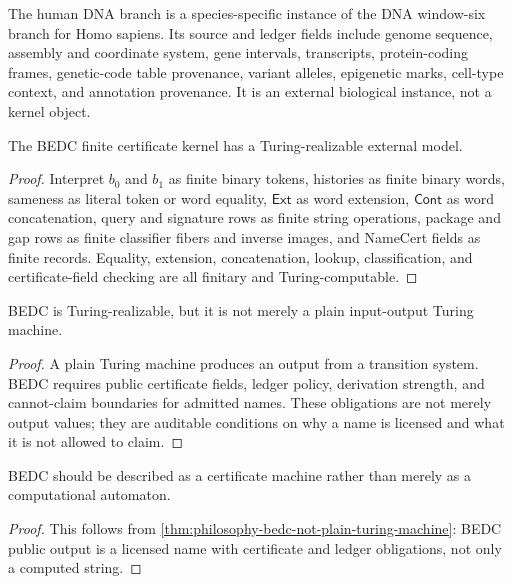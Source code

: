 \begin{definition}
\label{def:philosophy-human-dna-branch}
The human DNA branch is a species-specific instance of the DNA
window-six branch for Homo sapiens. Its source and ledger fields include
genome sequence, assembly and coordinate system, gene intervals,
transcripts, protein-coding frames, genetic-code table provenance,
variant alleles, epigenetic marks, cell-type context, and annotation
provenance. It is an external biological instance, not a kernel object.
\end{definition}

\begin{theorem}
\label{thm:philosophy-bedc-finite-kernel-turing-realizable}
The BEDC finite certificate kernel has a Turing-realizable external
model.
\end{theorem}
\begin{proof}
Interpret $b_{0}$ and $b_{1}$ as finite binary tokens, histories as
finite binary words, sameness as literal token or word equality,
$\mathsf{Ext}$ as word extension, $\mathsf{Cont}$ as word concatenation,
query and signature rows as finite string operations, package and gap
rows as finite classifier fibers and inverse images, and NameCert fields
as finite records. Equality, extension, concatenation, lookup,
classification, and certificate-field checking are all finitary and
Turing-computable.
\end{proof}

\begin{theorem}
\label{thm:philosophy-bedc-not-plain-turing-machine}
BEDC is Turing-realizable, but it is not merely a plain input-output
Turing machine.
\end{theorem}
\begin{proof}
A plain Turing machine produces an output from a transition system. BEDC
requires public certificate fields, ledger policy, derivation strength,
and cannot-claim boundaries for admitted names. These obligations are
not merely output values; they are auditable conditions on why a name is
licensed and what it is not allowed to claim.
\end{proof}

\begin{corollary}
\label{cor:philosophy-bedc-as-certificate-machine}
BEDC should be described as a certificate machine rather than merely as
a computational automaton.
\end{corollary}
\begin{proof}
This follows from
\autoref{thm:philosophy-bedc-not-plain-turing-machine}: BEDC public
output is a licensed name with certificate and ledger obligations, not
only a computed string.
\end{proof}

